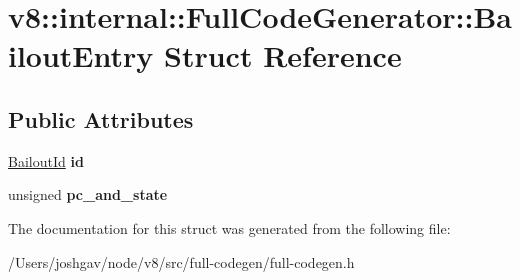 \hypertarget{structv8_1_1internal_1_1_full_code_generator_1_1_bailout_entry}{}\section{v8\+:\+:internal\+:\+:Full\+Code\+Generator\+:\+:Bailout\+Entry Struct Reference}
\label{structv8_1_1internal_1_1_full_code_generator_1_1_bailout_entry}
\subsection*{Public Attributes}
\begin{DoxyCompactItemize}
\item 
\hyperlink{classv8_1_1internal_1_1_bailout_id}{Bailout\+Id} {\bfseries id}\hypertarget{structv8_1_1internal_1_1_full_code_generator_1_1_bailout_entry_a4c1d9c3aa5e556e3a0163d22fcc643d5}{}\label{structv8_1_1internal_1_1_full_code_generator_1_1_bailout_entry_a4c1d9c3aa5e556e3a0163d22fcc643d5}

\item 
unsigned {\bfseries pc\+\_\+and\+\_\+state}\hypertarget{structv8_1_1internal_1_1_full_code_generator_1_1_bailout_entry_a3f42c7e783bfe634e2eda213bc47b1b2}{}\label{structv8_1_1internal_1_1_full_code_generator_1_1_bailout_entry_a3f42c7e783bfe634e2eda213bc47b1b2}

\end{DoxyCompactItemize}


The documentation for this struct was generated from the following file\+:\begin{DoxyCompactItemize}
\item 
/\+Users/joshgav/node/v8/src/full-\/codegen/full-\/codegen.\+h\end{DoxyCompactItemize}
